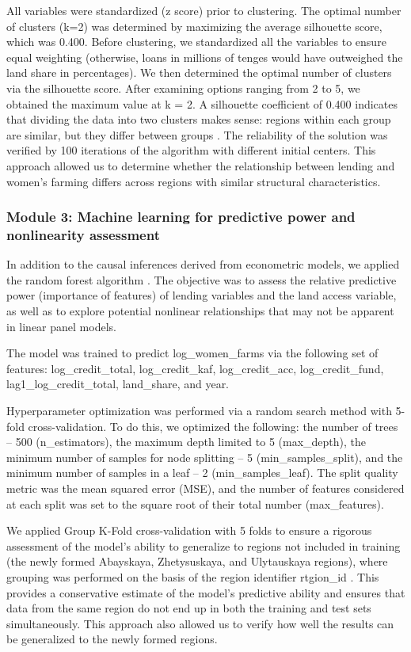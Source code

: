 ﻿\documentclass[pdflatex,sn-mathphys-ay]{sn-jnl}
\begin{document}
All variables were standardized (z score) prior to clustering. The
optimal number of clusters (k=2) was determined by maximizing the
average silhouette score, which was 0.400. Before clustering, we
standardized all the variables to ensure equal weighting (otherwise,
loans in millions of tenges would have outweighed the land share in
percentages). We then determined the optimal number of clusters via the silhouette
score. After examining options ranging from 2 to 5, we obtained the
maximum value at k = 2. A silhouette coefficient of 0.400 indicates that
dividing the data into two clusters makes sense: regions within each
group are similar, but they differ between groups \citep{ref45}. The reliability of the solution was verified by 100 iterations
of the algorithm with different initial centers. This approach allowed
us to determine whether the relationship between lending and women's
farming differs across regions with similar structural characteristics.

\subsubsection{Module 3: Machine learning for predictive power and nonlinearity assessment}

In addition to the causal inferences derived from econometric models, we
applied the random forest algorithm \citep{ref83}. The
objective was to assess the relative predictive power (importance of
features) of lending variables and the land access variable, as well as
to explore potential nonlinear relationships that may not be apparent in
linear panel models.

The model was trained to predict log\_women\_farms via the following
set of features: log\_credit\_total, log\_credit\_kaf, log\_credit\_acc,
log\_credit\_fund, lag1\_log\_credit\_total, land\_share, and year.

Hyperparameter optimization was performed via a random search method
with 5-fold cross-validation. To do this, we optimized the following:
the number of trees -- 500 (n\_estimators), the maximum depth limited to
5 (max\_depth), the minimum number of samples for node splitting -- 5
(min\_samples\_split), and the minimum number of samples in a leaf -- 2
(min\_samples\_leaf). The split quality metric was the mean squared
error (MSE), and the number of features considered at each split was set
to the square root of their total number (max\_features).

We applied Group K-Fold cross-validation with 5 folds to ensure a
rigorous assessment of the model's ability to generalize to regions not
included in training (the newly formed Abayskaya, Zhetysuskaya, and
Ulytauskaya regions), where grouping was performed on the basis of the region
identifier rtgion\_id \citep{ref65}. This provides a
conservative estimate of the model's predictive ability and ensures that
data from the same region do not end up in both the training and test
sets simultaneously. This approach also allowed us to verify how well the results
can be generalized to the newly formed regions.
\end{document}
